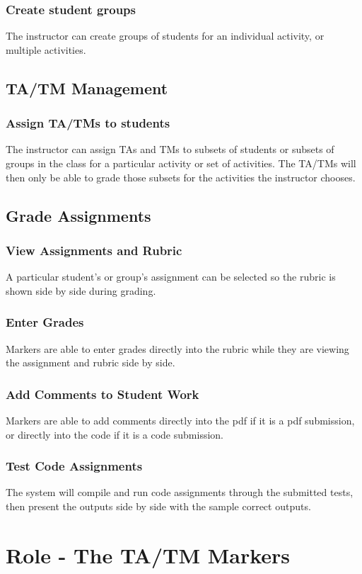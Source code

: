 \documentclass{article}
\begin{document}
\subsubsection{Create student groups}
The instructor can create groups of students for an individual activity, or
multiple activities. 
\subsection{TA/TM Management}
\subsubsection{Assign TA/TMs to students}
The instructor can assign TAs and TMs to subsets of students or subsets of 
groups in the class for a particular activity or set of activities. The TA/TMs will then
only be able to grade those subsets for the activities the instructor chooses.
\subsection{Grade Assignments}
\subsubsection{View Assignments and Rubric}
A particular student's or group's assignment can be selected so the rubric is
shown side by side during grading.
\subsubsection{Enter Grades}
Markers are able to enter grades directly into the rubric while they are viewing
the assignment and rubric side by side.
\subsubsection{Add Comments to Student Work}
Markers are able to add comments directly into the pdf if it is a pdf submission,
or directly into the code if it is a code submission.
\subsubsection{Test Code Assignments}
The system will compile and run code assignments through the submitted tests,
then present the outputs side by side with the sample correct outputs.

\section{Role - The TA/TM Markers}
\end{document}
